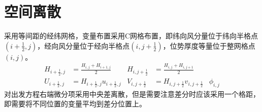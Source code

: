 \documentclass{ctexart}
\begin{document}
\section{空间离散}
采用等间距的经纬网格，变量布置采用C网格布置，即纬向风分量位于纬向半格点$\left( i + \frac{1}{2}, j \right)$，经向风分量位于经向半格点$\left( i, j + \frac{1}{2} \right)$，位势厚度等量位于整网格点$\left( i, j \right)$。
\begin{align}
  H_{i+\frac{1}{2},j} & = \frac{H_{i,j} + H_{i+1,j}}{2} & H_{i,j+\frac{1}{2}} & = \frac{H_{i,j} + H_{i,j+1}}{2} \nonumber \\
  U_{i+\frac{1}{2},j} & = H_{i+\frac{1}{2},j} u_{i+\frac{1}{2},j} & V_{i,j+\frac{1}{2}} & = H_{i,j+\frac{1}{2}} v_{i,j+\frac{1}{2}} & \phi_{i,j} \nonumber
\end{align}
对出发方程右端微分项采用中央差离散，但是需要注意差分时应该采用一个格距，即需要将不同位置的变量平均到差分位置上。
\end{document}
